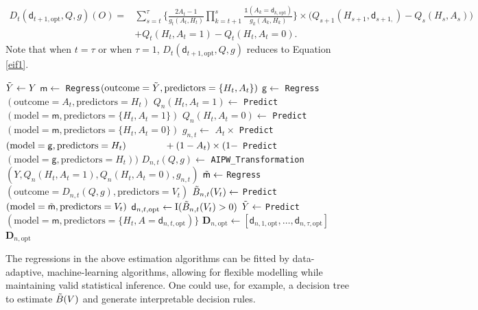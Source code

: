 \documentclass[11pt]{article}
\renewcommand{\d}{\mathsf{d}}
\newcommand{\m}{\mathsf{m}}
\newcommand{\g}{\mathsf{g}}
\theoremstyle{example}
\begin{document}
\begin{equation}\label{eif3}
\begin{split}
    D_t(\d_{t+1, \text{opt}}, Q, g)(O) = &\sum_{s = t}^{\tau} \bigg\{ \frac{2A_t - 1}{g_t(A_t, H_t)} \prod_{k = t+1}^{s} \frac{\mathds{1}(A_{k} = \d_{k, \text{opt}})}{g_{k}(A_{k}, H_{k})} \bigg\} \times \Big(Q_{s+1}(H_{s+1}, \d_{s+1,\text{}}) - Q_s(H_s, A_s)\Big)\\ &+ Q_t(H_t, A_t = 1) - Q_t(H_t, A_t = 0).
\end{split}
\end{equation}
Note that when $t = \tau$ or when $\tau = 1$, $D_t(\d_{t+1, \text{opt}}, Q, g)$ reduces to Equation \ref{eif1}.

\begin{algorithm}[H]
\caption{Generalization of Algorithm \ref{alg:odtr} to estimate $\mathbf{D}_{ \text{opt}}$}\label{alg:lodtr}
\begin{algorithmic}[1]
\State $\Tilde{Y} \gets Y$
\State $\m \gets$ \texttt{Regress}$(\text{outcome} = \Tilde{Y}, \text{predictors} = \{H_t, A_t\})$
\State $\g \gets$ \texttt{Regress}$(\text{outcome} = A_t, \text{predictors} = H_t)$
\State $Q_n(H_t, A_t = 1) \gets$ \texttt{Predict}$(\text{model} = \m, \text{predictors} = \{H_t, A_t = 1\})$
\State $Q_n(H_t, A_t = 0) \gets$ \texttt{Predict}$(\text{model} = \m, \text{predictors} = \{H_t, A_t = 0\})$
\State $g_{n, t} \gets$ $A_t \times$ \texttt{Predict}$(\text{model} = \g, \text{predictors} = H_t)\newline
        \hspace*{4em} + (1 - A_t) \times (1 - $ \texttt{Predict}$(\text{model} = \g, \text{predictors} = H_t))$
\State $D_{n, t}(Q, g) \gets$ \texttt{AIPW\_Transformation}$(Y, Q_n(H_t, A_t = 1), Q_n(H_t, A_t = 0), g_{n, t})$ 
\State $\Tilde{\m} \gets$ \texttt{Regress}$(\text{outcome} = D_{n, t}(Q, g), \text{predictors} = V_t)$
\State $\Tilde{B}_{n, t}(V_t) \gets$ \texttt{Predict}$(\text{model} = \Tilde{\m}, \text{predictors} = V_t)$
\State $\d_{n, t, \text{opt}} \gets \mathrm{I}(\Tilde{B}_{n, t}(V_t) > 0)$ 
\State $\Tilde{Y} \gets$ \texttt{Predict}$(\text{model} = \m, \text{predictors} = \{H_t, A = \d_{n, t, \text{opt}})\}$
\EndFor
\State $\mathbf{D}_{n, \text{opt}} \gets [\d_{n, 1, \text{opt}}, \dots, \d_{n, \tau, \text{opt}}]$
\State \Return $\mathbf{D}_{n, \text{opt}}$
\end{algorithmic}
\end{algorithm}

The regressions in the above estimation algorithms can be fitted by data-adaptive, machine-learning algorithms, allowing for flexible modelling while maintaining valid statistical inference. One could use, for example, a decision tree to estimate $\Tilde{B}(V)$ and generate interpretable decision rules. 
\end{document}

